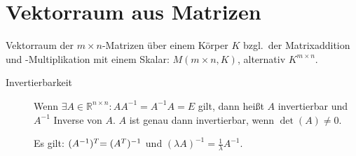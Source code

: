\section{Vektorraum aus Matrizen}

Vektorraum der $m\times n$-Matrizen über einem Körper $K$ bzgl.~der Matrixaddition und -Multiplikation mit einem Skalar: $M(m\times n,K)$, alternativ $K^{m\times n}$.
\begin{description}
  \item [{Invertierbarkeit}]
	Wenn $\exists A\in\mathbb{R}^{n\times n}:AA^{-1}=A^{-1}A=E$ gilt, dann heißt $A$ invertierbar
	und $A^{-1}$ Inverse von $A$. $A$ ist genau dann invertierbar, wenn $\det(A)\neq0$.

	Es gilt: $(A^{-1})\t = (A^T)^{-1}$ und $(\lambda A)^{-1}=\frac{1}{\lambda}A^{-1}$.
\end{description}
